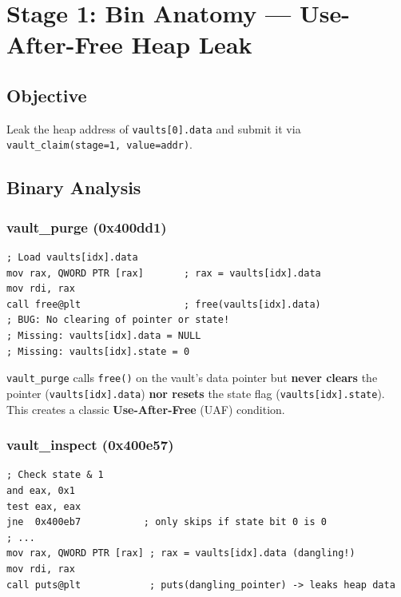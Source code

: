 \documentclass[12pt,a4paper]{article}
\begin{document}
\newpage
\section{Stage 1: Bin Anatomy — Use-After-Free Heap Leak}

\subsection{Objective}

Leak the heap address of \texttt{vaults[0].data} and submit it via
\texttt{vault\_claim(stage=1, value=addr)}.

\subsection{Binary Analysis}

\subsubsection{vault\_purge (0x400dd1)}

\begin{lstlisting}[style=asm, caption={vault\_purge — frees without clearing pointer}]
; Load vaults[idx].data
mov rax, QWORD PTR [rax]       ; rax = vaults[idx].data
mov rdi, rax
call free@plt                  ; free(vaults[idx].data)
; BUG: No clearing of pointer or state!
; Missing: vaults[idx].data = NULL
; Missing: vaults[idx].state = 0
\end{lstlisting}

\begin{vulnbox}
\texttt{vault\_purge} calls \texttt{free()} on the vault's data pointer but
\textbf{never clears} the pointer (\texttt{vaults[idx].data}) \textbf{nor resets}
the state flag (\texttt{vaults[idx].state}). This creates a classic
\textbf{Use-After-Free} (UAF) condition.
\end{vulnbox}

\subsubsection{vault\_inspect (0x400e57)}

\begin{lstlisting}[style=asm, caption={vault\_inspect — reads through dangling pointer}]
; Check state & 1
and eax, 0x1
test eax, eax
jne  0x400eb7           ; only skips if state bit 0 is 0
; ...
mov rax, QWORD PTR [rax] ; rax = vaults[idx].data (dangling!)
mov rdi, rax
call puts@plt            ; puts(dangling_pointer) -> leaks heap data
\end{lstlisting}
\end{document}
